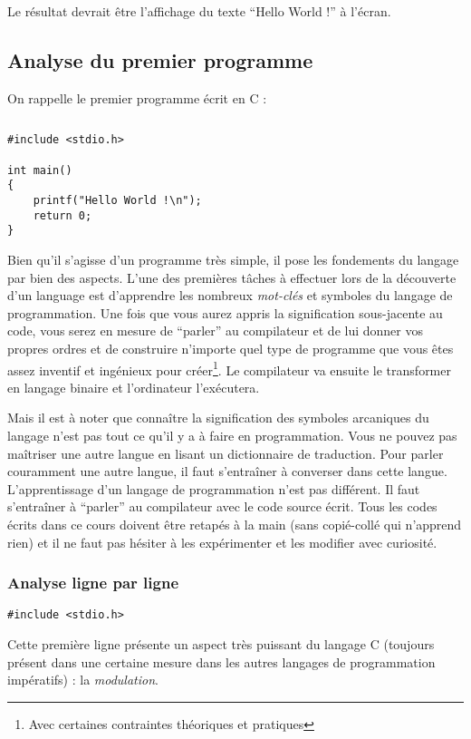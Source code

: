 \documentclass[../../main.tex]{subfiles}
\begin{document}
Le résultat devrait être l'affichage du texte ``Hello World !'' à l'écran.
\subsection{Analyse du premier programme} \label{sub:analyse_du_premier_programme}
On rappelle le premier programme écrit en C :
\begin{lstlisting}[title=Un premier programme]
\end{lstlisting}
\begin{verbatim}
#include <stdio.h>

int main()
{
	printf("Hello World !\n");
	return 0;
}
\end{verbatim}
Bien qu'il s'agisse d'un programme très simple, il pose les fondements du langage par bien des aspects. L'une des premières tâches à effectuer lors de la découverte d'un language est d'apprendre les nombreux \textit{mot-clés} et symboles du langage de programmation. Une fois que vous aurez appris la signification sous-jacente au code, vous serez en mesure de ``parler'' au compilateur et de lui donner vos propres ordres et de construire n'importe quel type de programme que vous êtes assez inventif et ingénieux pour créer\footnote{Avec certaines contraintes théoriques et pratiques}. Le compilateur va ensuite le transformer en langage binaire et l'ordinateur l'exécutera.

Mais il est à noter que connaître la signification des symboles arcaniques du langage n'est pas tout ce qu'il y a à faire en programmation. Vous ne pouvez pas maîtriser une autre langue en lisant un dictionnaire de traduction. Pour parler couramment une autre langue, il faut s'entraîner à converser dans cette langue. L'apprentissage d'un langage de programmation n'est pas différent. Il faut s'entraîner à ``parler'' au compilateur avec le code source écrit. Tous les codes écrits dans ce cours doivent être retapés à la main (sans copié-collé qui n'apprend rien) et il ne faut pas hésiter à les expérimenter et les modifier avec curiosité.

\subsubsection{Analyse ligne par ligne} \label{ssub:analyse_ligne_par_ligne}
\begin{verbatim}
#include <stdio.h>
\end{verbatim}
Cette première ligne présente un aspect très puissant du langage C (toujours présent dans une certaine mesure dans les autres langages de programmation impératifs) : la \textit{modulation}.
\end{document}
